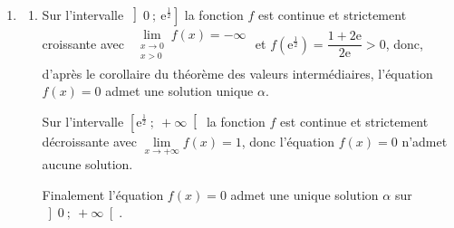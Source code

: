 \begin{enumerate}
\[1 - 2\ln(x) \geqslant 0 \iff -2 \ln(x) \geqslant -1 \iff \ln(x) \leqslant \dfrac{1}{2} \iff x \leqslant \text{e}^{\frac{1}{2}} \qquad (\text{car}\ x\mapsto \text{e}^{x}\ \text{est croissante})\]

\begin{minipage}{.6\linewidth}
\begin{center}
\end{center}
\end{minipage}\hfill
\begin{minipage}{.3\linewidth}
\begin{eqnarray*}
f\left(\text{e}^{\frac{1}{2}}\right) &=& \dfrac{\ln\left(\text{e}^{\frac{1}{2}}\right)}{\left(\text{e}^{\frac{1}{2}}\right)^{2}} + 1\\
	&=& \dfrac{\dfrac{1}{2}}{\text{e}^{2\times\frac{1}{2}}} + 1\\
	&=& \dfrac{1}{2\text{e}} + 1\\
	&=& \dfrac{1+2\text{e}}{2\text{e}} \approx 1, 184
\end{eqnarray*}
\end{minipage}
	\item
	\begin{enumerate}
	
		\item Sur l'intervalle \ensuremath{\left]0~;~\text{e}^{\frac{1}{2}}\right]} la fonction $f$ est continue et strictement croissante avec $\begin{gathered}\lim\limits_{\substack{x \to 0\\x > 0}}f(x) = -\infty\end{gathered}$ et $f\left(\text{e}^{\frac{1}{2}}\right) = \dfrac{1+2\text{e}}{2\text{e}} > 0$, donc, d'après le corollaire du théorème des valeurs intermédiaires, l'équation $f(x) = 0$ admet une solution unique $\alpha$.

Sur l'intervalle \ensuremath{\left[\text{e}^{\frac{1}{2}}~;~+\infty\right[} la fonction $f$ est continue et strictement décroissante avec $\lim\limits_{x \to +\infty}f(x) = 1$, donc l'équation $f(x) = 0$ n'admet aucune solution.

Finalement l'équation $f(x) = 0$ admet une unique solution $\alpha$ sur \ensuremath{\left]0~;~+\infty\right[}.


\end{enumerate}
\end{enumerate}
